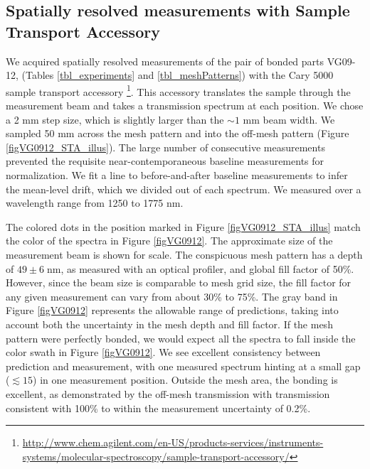 \documentclass[osajnl,preprint,showpacs,superscriptaddress,12pt]{revtex4-1} %
\begin{document}
\subsection{Spatially resolved measurements with Sample Transport Accessory}
We acquired spatially resolved measurements of the pair of bonded parts VG09-12, (Tables \ref{tbl_experiments} and \ref{tbl_meshPatterns}) with the Cary 5000 sample transport accessory \footnote{\url{http://www.chem.agilent.com/en-US/products-services/instruments-systems/molecular-spectroscopy/sample-transport-accessory/}}.  This accessory translates the sample through the measurement beam and takes a transmission spectrum at each position.  We chose a 2 mm step size, which is slightly larger than the $\sim1$ mm beam width.  We sampled 50 mm across the mesh pattern and into the off-mesh pattern (Figure \ref{figVG0912_STA_illus}).  The large number of consecutive measurements prevented the requisite near-contemporaneous baseline measurements for normalization.  We fit a line to before-and-after baseline measurements to infer the mean-level drift, which we divided out of each spectrum.  We measured over a wavelength range from 1250 to 1775 nm.

The colored dots in the position marked in Figure \ref{figVG0912_STA_illus} match the color of the spectra in Figure \ref{figVG0912}.  The approximate size of the measurement beam is shown for scale.  The conspicuous mesh pattern has a depth of $49\pm6\;$nm, as measured with an optical profiler, and global fill factor of 50\%.  However, since the beam size is comparable to mesh grid size, the fill factor for any given measurement can vary from about 30\% to 75\%.  The gray band in Figure \ref{figVG0912} represents the allowable range of predictions, taking into account both the uncertainty in the mesh depth and fill factor.  If the mesh pattern were perfectly bonded, we would expect all the spectra to fall inside the color swath in Figure \ref{figVG0912}.  We see excellent consistency between prediction and measurement, with one measured spectrum hinting at a small gap ($\lesssim15$) in one measurement position.  Outside the mesh area, the bonding is excellent, as demonstrated by the off-mesh transmission with transmission consistent with 100\% to within the measurement uncertainty of 0.2\%.
\end{document}
